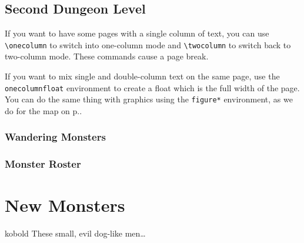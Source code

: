 \documentclass[a4paper,serif]{module}
\begin{document}

\begin{onecolumnfloat}[t]
\part{Second Dungeon Level}

If you want to have some pages with a single column of text, you can use \verb|\onecolumn| to switch
into one-column mode and \verb|\twocolumn| to switch back to two-column mode. These commands cause
a page break.

If you want to mix single and double-column text on the same page, use the \verb|onecolumnfloat| environment
to create a float which is the full width of the page. You can do the same thing with graphics using
the \verb|figure*| environment, as we do for the map on p.\pageref{img:map}.

\section*{Wandering Monsters}
\label{wanderingmonsters}

\begin{wanderingmonsters}[b]
\end{wanderingmonsters}

\section*{Monster Roster}

\begin{monsterroster}
\end{monsterroster}
\end{onecolumnfloat}

\lipsum

%
%

\part{New Monsters}

\begin{newmonster}{kobold}
These small, evil dog-like men\ldots

\lipsum
\end{newmonster}
\end{document}
